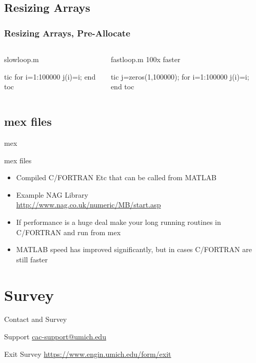 \documentclass[handout]{beamer}
\begin{document}
   \subsection{Resizing Arrays}
\begin{frame}[fragile]
\frametitle{Resizing Arrays, Pre-Allocate}
\begin{columns}[T]
\begin{column}{5cm}
 \begin{block}{slowloop.m}
  \begin{semiverbatim}
tic
for i=1:100000
    j(i)=i;
end
toc
  \end{semiverbatim}
 \end{block}
\end{column}
\begin{column}{5cm}
\begin{block}{fastloop.m 100x faster}
\begin{semiverbatim}
tic
j=zeros(1,100000);
for i=1:100000
    j(i)=i;
end
toc
\end{semiverbatim}
\end{block}
\end{column}
\end{columns}
\end{frame}

   \subsection{mex files}
\begin{frame}{mex}
\begin{block}{mex files}
 \begin{itemize}
  \item Compiled C/FORTRAN Etc that can be called from MATLAB
  \item Example NAG Library \\
\url{http://www.nag.co.uk/numeric/MB/start.asp}
  \item If performance is a huge deal make your long running routines in C/FORTRAN and run from mex
  \item MATLAB speed has improved significantly, but in cases C/FORTRAN are still faster
 \end{itemize}
\end{block}
%
\end{frame}
  \section{Survey}
  \begin{frame}{Contact and Survey}
   \begin{block}{Support}
    \url{cac-support@umich.edu}
   \end{block}
   \begin{block}{Exit Survey}
    \url{https://www.engin.umich.edu/form/exit}
   \end{block}
  \end{frame}
\end{document}
